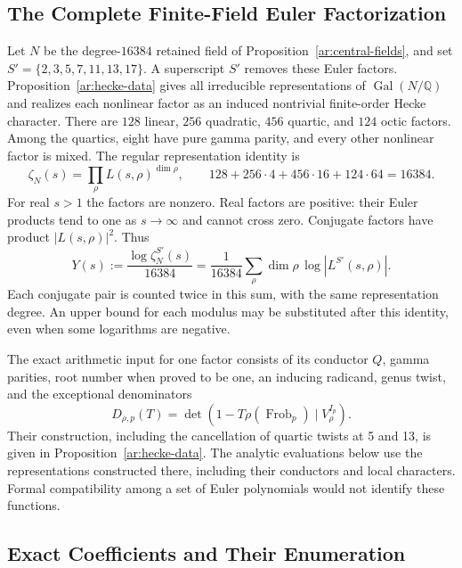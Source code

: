 \subsection{The Complete Finite-Field Euler Factorization}
\label{an:factorization}

Let $N$ be the degree-$16384$ retained field of
Proposition~\ref{ar:central-fields}, and set
$S'=\{2,3,5,7,11,13,17\}$. A superscript $S'$ removes these Euler
factors. Proposition~\ref{ar:hecke-data} gives all irreducible
representations of $\operatorname{Gal}(N/\mathbb Q)$ and realizes
each nonlinear factor as an induced nontrivial finite-order Hecke
character. There are $128$ linear, $256$ quadratic, $456$ quartic,
and $124$ octic factors. Among the quartics, eight have pure gamma
parity, and every other nonlinear factor is mixed. The regular
representation identity is
\begin{equation}\label{an:regular-factorization}
 \zeta_N(s)=\prod_\rho L(s,\rho)^{\dim\rho},\qquad
 128+256\cdot4+456\cdot16+124\cdot64=16384.
\end{equation}
For real $s>1$ the factors are nonzero. Real factors are positive:
their Euler products tend to one as $s\to\infty$ and cannot cross
zero. Conjugate factors have product $|L(s,\rho)|^2$. Thus
\begin{equation}\label{an:Y}
 Y(s):=\frac{\log\zeta_N^{S'}(s)}{16384}
 =\frac1{16384}\sum_\rho\dim\rho\,
          \log|L^{S'}(s,\rho)|.
\end{equation}
Each conjugate pair is counted twice in this sum, with the same
representation degree. An upper bound for each modulus may be
substituted after this identity, even when some logarithms are negative.

The exact arithmetic input for one factor consists of its conductor
$Q$, gamma parities, root number when proved to be one, an inducing
radicand, genus twist, and the exceptional denominators
\[
 D_{\rho,p}(T)=\det(1-T\rho(\operatorname{Frob}_p)
                         \mid V_\rho^{I_p}).
\]
Their construction, including the cancellation of quartic twists at
5 and 13, is given in Proposition~\ref{ar:hecke-data}. The
analytic evaluations below use the representations constructed there,
including their conductors and local characters. Formal compatibility
among a set of Euler polynomials would not identify these functions.

\subsection{Exact Coefficients and Their Enumeration}
\label{an:coefficients}

